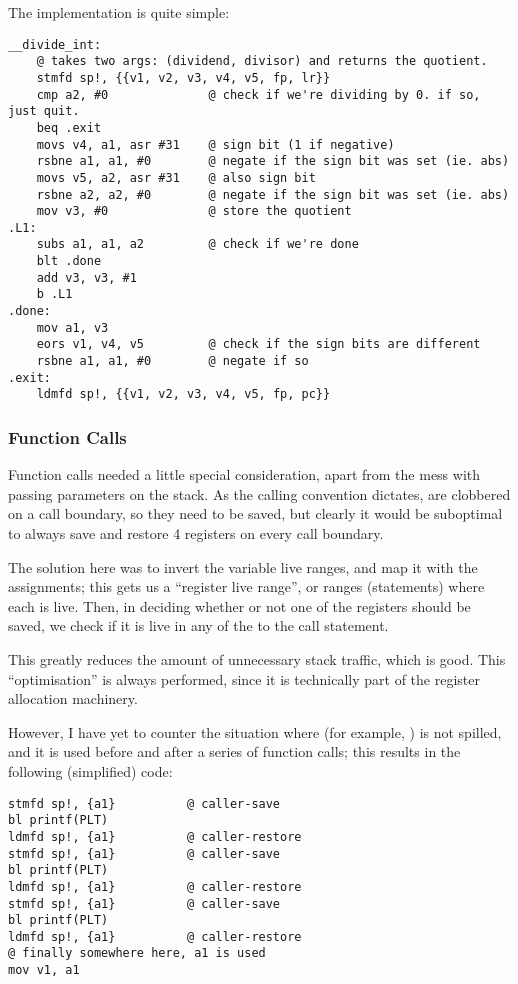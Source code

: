 \documentclass[12pt]{article}
\begin{document}
The implementation is quite simple:

\begin{verbatim}
__divide_int:
	@ takes two args: (dividend, divisor) and returns the quotient.
	stmfd sp!, {{v1, v2, v3, v4, v5, fp, lr}}
	cmp a2, #0              @ check if we're dividing by 0. if so, just quit.
	beq .exit
	movs v4, a1, asr #31    @ sign bit (1 if negative)
	rsbne a1, a1, #0        @ negate if the sign bit was set (ie. abs)
	movs v5, a2, asr #31    @ also sign bit
	rsbne a2, a2, #0        @ negate if the sign bit was set (ie. abs)
	mov v3, #0              @ store the quotient
.L1:
	subs a1, a1, a2         @ check if we're done
	blt .done
	add v3, v3, #1
	b .L1
.done:
	mov a1, v3
	eors v1, v4, v5         @ check if the sign bits are different
	rsbne a1, a1, #0        @ negate if so
.exit:
	ldmfd sp!, {{v1, v2, v3, v4, v5, fp, pc}}
\end{verbatim}



\subsubsection{Function Calls}

Function calls needed a little special consideration, apart from the mess with passing parameters on the stack. As
the calling convention dictates,  are clobbered on a call boundary, so they need to be saved, but clearly it
would be suboptimal to always save and restore 4 registers on every call boundary.

The solution here was to invert the variable live ranges, and map it with the assignments; this gets us a
\enquote{register live range}, or ranges (statements) where each  is live. Then, in deciding whether or not
one of the  registers should be saved, we check if it is live in any of the  to the call statement.

This greatly reduces the amount of unnecessary stack traffic, which is good. This \enquote{optimisation} is always
performed, since it is technically part of the register allocation machinery.

However, I have yet to counter the situation where (for example, ) is not spilled, and it is used before
and after a series of function calls; this results in the following (simplified) code:

\begin{verbatim}
stmfd sp!, {a1}          @ caller-save
bl printf(PLT)
ldmfd sp!, {a1}          @ caller-restore
stmfd sp!, {a1}          @ caller-save
bl printf(PLT)
ldmfd sp!, {a1}          @ caller-restore
stmfd sp!, {a1}          @ caller-save
bl printf(PLT)
ldmfd sp!, {a1}          @ caller-restore
@ finally somewhere here, a1 is used
mov v1, a1
\end{verbatim}
\end{document}
